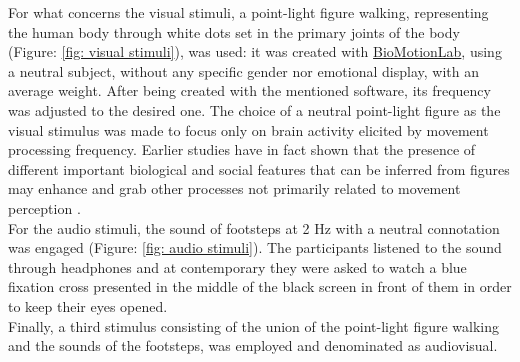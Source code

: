 For what concerns the visual stimuli, a point-light figure walking, representing the human body through white dots set in the primary joints of the body (Figure: \ref{fig: visual stimuli}), was used: it was created with \href{https://www.biomotionlab.ca/html5-bml-walker/}{BioMotionLab}, using a neutral subject, without any specific gender nor emotional display, with an average weight. After being created with the mentioned software, its frequency was adjusted to the desired one. The choice of a neutral point-light figure as the visual stimulus was made to focus only on brain activity elicited by movement processing frequency. Earlier studies have in fact shown that the presence of different important biological and social features that can be inferred from figures may enhance and grab other processes not primarily related to movement perception \parencite{Cracco_2022}. \\
For the audio stimuli, the sound of footsteps at 2 Hz with a neutral connotation was engaged (Figure: \ref{fig: audio stimuli}). The participants listened to the sound through headphones and at contemporary they were asked to watch a blue fixation cross presented in the middle of the black screen in front of them in order to keep their eyes opened. \\
Finally, a third stimulus consisting of the union of the point-light figure walking and the sounds of the footsteps, was employed and denominated as audiovisual. 
